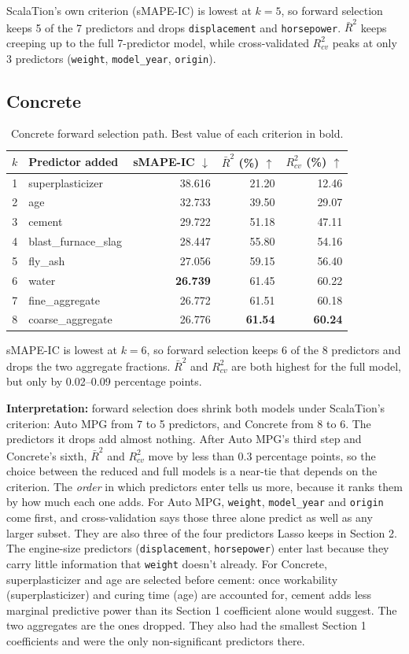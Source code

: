 \documentclass[11pt]{article}
\begin{document}
ScalaTion's own criterion (sMAPE-IC) is lowest at $k=5$, so forward selection
keeps 5 of the 7 predictors and drops \texttt{displacement} and
\texttt{horsepower}. $\bar R^2$ keeps creeping up to the full 7-predictor
model, while cross-validated $R^2_{cv}$ peaks at only 3 predictors
(\texttt{weight}, \texttt{model\_year}, \texttt{origin}).

\subsection{Concrete}
\begin{table}[H]
\centering
\caption{Concrete forward selection path. Best value of each criterion in
bold.}
\begin{tabular}{rlrrr}
\toprule
$k$ & Predictor added & sMAPE-IC $\downarrow$ & $\bar R^2$ (\%) $\uparrow$ & $R^2_{cv}$ (\%) $\uparrow$ \\
\midrule
1 & superplasticizer & 38.616 & 21.20 & 12.46 \\
2 & age & 32.733 & 39.50 & 29.07 \\
3 & cement & 29.722 & 51.18 & 47.11 \\
4 & blast\_furnace\_slag & 28.447 & 55.80 & 54.16 \\
5 & fly\_ash & 27.056 & 59.15 & 56.40 \\
6 & water & \textbf{26.739} & 61.45 & 60.22 \\
7 & fine\_aggregate & 26.772 & 61.51 & 60.18 \\
8 & coarse\_aggregate & 26.776 & \textbf{61.54} & \textbf{60.24} \\
\bottomrule
\end{tabular}
\end{table}

sMAPE-IC is lowest at $k=6$, so forward selection keeps 6 of the 8 predictors
and drops the two aggregate fractions. $\bar R^2$ and $R^2_{cv}$ are both
highest for the full model, but only by 0.02--0.09 percentage points.

\textbf{Interpretation:} forward selection does shrink both models under
ScalaTion's criterion: Auto MPG from 7 to 5 predictors, and Concrete from 8 to
6. The predictors it drops add almost nothing. After Auto MPG's third step and
Concrete's sixth, $\bar R^2$ and $R^2_{cv}$ move by less than 0.3 percentage
points, so the choice between the reduced and full models is a near-tie that
depends on the criterion. The \emph{order} in which predictors enter tells us
more, because it ranks them by how much each one adds. For Auto MPG,
\texttt{weight}, \texttt{model\_year} and \texttt{origin} come first, and
cross-validation says those three alone predict as well as any larger subset.
They are also three of the four predictors Lasso keeps in Section 2. The
engine-size predictors (\texttt{displacement}, \texttt{horsepower}) enter
last because they carry little information that \texttt{weight} doesn't
already. For Concrete, superplasticizer and age are selected before cement:
once workability (superplasticizer) and curing time (age) are accounted for,
cement adds less marginal predictive power than its Section 1 coefficient
alone would suggest. The two aggregates are the ones dropped. They also had
the smallest Section 1 coefficients and were the only non-significant
predictors there.
\end{document}
